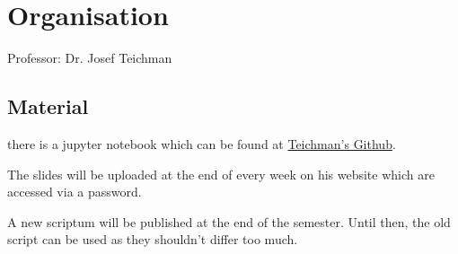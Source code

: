 \section*{Organisation}

Professor: Dr. Josef Teichman

\subsection*{Material}

there is a jupyter notebook which can be found at \href{https://gist.github.com/jteichma/a9c2621e0a27faf1b8a885c039120778}{Teichman's Github}.

The slides will be uploaded at the end of every week on his website which are accessed via a password.

A new scriptum will be published at the end of the semester. Until then, the old script can be used as they shouldn't differ too much.


